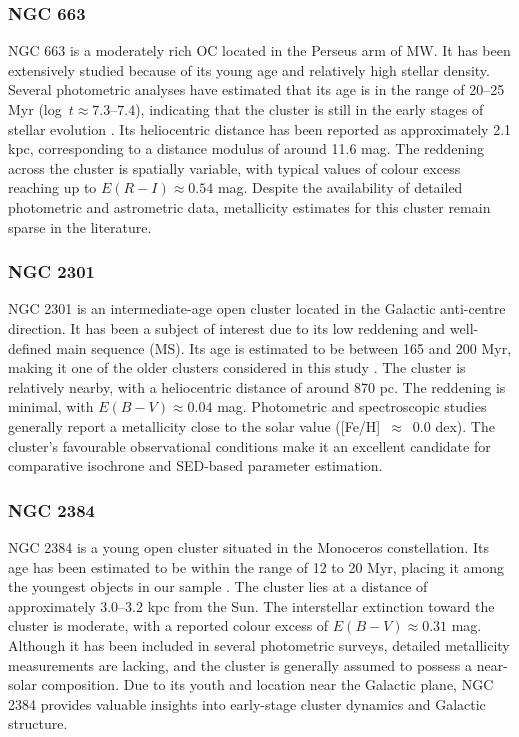 \documentclass[referee]{raa}            %
\begin{document}
\subsubsection{NGC 663}
NGC 663 is a moderately rich OC located in the Perseus arm of MW. It has been extensively studied because of its young age and relatively high stellar density. Several photometric analyses have estimated that its age is in the range of 20--25 Myr (log~$t \approx 7.3$--$7.4$), indicating that the cluster is still in the early stages of stellar evolution \citep{pigulski2001,Fabregat2005}. Its heliocentric distance has been reported as approximately 2.1 kpc, corresponding to a distance modulus of around 11.6 mag. The reddening across the cluster is spatially variable, with typical values of colour excess reaching up to $E(R-I) \approx 0.54$ mag. Despite the availability of detailed photometric and astrometric data, metallicity estimates for this cluster remain sparse in the literature.

\subsubsection{NGC 2301}

NGC 2301 is an intermediate-age open cluster located in the Galactic anti-centre direction. It has been a subject of interest due to its low reddening and well-defined main sequence (MS). Its age is estimated to be between 165 and 200 Myr, making it one of the older clusters considered in this study \citep{Sukhbold2009}. The cluster is relatively nearby, with a heliocentric distance of around 870 pc. The reddening is minimal, with $E(B-V) \approx 0.04$ mag. Photometric and spectroscopic studies generally report a metallicity close to the solar value ([Fe/H]~$\approx$~0.0 dex). The cluster’s favourable observational conditions make it an excellent candidate for comparative isochrone and SED-based parameter estimation.

\subsubsection{NGC 2384}

NGC 2384 is a young open cluster situated in the Monoceros constellation. Its age has been estimated to be within the range of 12 to 20 Myr, placing it among the youngest objects in our sample \citep{hasan2008,Vazquez2010}. The cluster lies at a distance of approximately 3.0--3.2 kpc from the Sun. The interstellar extinction toward the cluster is moderate, with a reported colour excess of $E(B-V) \approx 0.31$ mag. Although it has been included in several photometric surveys, detailed metallicity measurements are lacking, and the cluster is generally assumed to possess a near-solar composition. Due to its youth and location near the Galactic plane, NGC 2384 provides valuable insights into early-stage cluster dynamics and Galactic structure.
\end{document}
